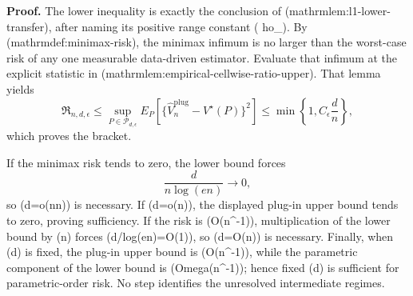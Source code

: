 \textbf{Proof.}
The lower inequality is exactly the conclusion of (mathrm{lem:l1-lower-transfer}), after naming its positive range constant (
ho_\epsilon).  By (mathrm{def:minimax-risk}), the minimax infimum is no larger than the worst-case risk of any one measurable data-driven estimator.  Evaluate that infimum at the explicit statistic in (mathrm{lem:empirical-cellwise-ratio-upper}).  That lemma yields
\[
 \mathfrak R_{n,d,\epsilon}
 \leq\sup_{P\in\mathcal P_{d,\epsilon}}
 E_P\!\left[
  \{\widehat V_n^{\mathrm{plug}}-V^\star(P)\}^2
 \right]
 \leq\min\left\{1,C_\epsilon\frac d n\right\},
\]
which proves the bracket.

If the minimax risk tends to zero, the lower bound forces
\[
 \frac d{n\log(en)}\longrightarrow0,
\]
so (d=o(n\log n)) is necessary.  If (d=o(n)), the displayed plug-in upper bound tends to zero, proving sufficiency.  If the risk is (O(n^{-1})), multiplication of the lower bound by (n) forces (d/log(en)=O(1)), so (d=O(\log n)) is necessary.  Finally, when (d) is fixed, the plug-in upper bound is (O(n^{-1})), while the parametric component of the lower bound is (Omega(n^{-1})); hence fixed (d) is sufficient for parametric-order risk.  No step identifies the unresolved intermediate regimes.